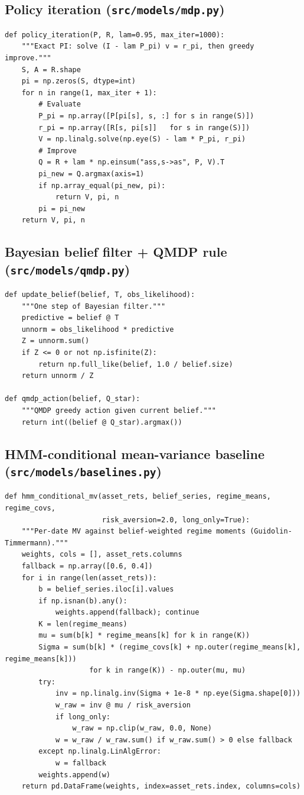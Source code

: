 \documentclass[11pt]{article}
\theoremstyle{plain1}
\theoremstyle{definition1}
\newcommand{\1}{\mathbf{1}}
\begin{document}
\subsection{Policy iteration (\texttt{src/models/mdp.py})}
\begin{lstlisting}
def policy_iteration(P, R, lam=0.95, max_iter=1000):
    """Exact PI: solve (I - lam P_pi) v = r_pi, then greedy improve."""
    S, A = R.shape
    pi = np.zeros(S, dtype=int)
    for n in range(1, max_iter + 1):
        # Evaluate
        P_pi = np.array([P[pi[s], s, :] for s in range(S)])
        r_pi = np.array([R[s, pi[s]]   for s in range(S)])
        V = np.linalg.solve(np.eye(S) - lam * P_pi, r_pi)
        # Improve
        Q = R + lam * np.einsum("ass,s->as", P, V).T
        pi_new = Q.argmax(axis=1)
        if np.array_equal(pi_new, pi):
            return V, pi, n
        pi = pi_new
    return V, pi, n
\end{lstlisting}

\subsection{Bayesian belief filter + QMDP rule (\texttt{src/models/qmdp.py})}
\begin{lstlisting}
def update_belief(belief, T, obs_likelihood):
    """One step of Bayesian filter."""
    predictive = belief @ T
    unnorm = obs_likelihood * predictive
    Z = unnorm.sum()
    if Z <= 0 or not np.isfinite(Z):
        return np.full_like(belief, 1.0 / belief.size)
    return unnorm / Z

def qmdp_action(belief, Q_star):
    """QMDP greedy action given current belief."""
    return int((belief @ Q_star).argmax())
\end{lstlisting}

\subsection{HMM-conditional mean-variance baseline (\texttt{src/models/baselines.py})}
\begin{lstlisting}
def hmm_conditional_mv(asset_rets, belief_series, regime_means, regime_covs,
                       risk_aversion=2.0, long_only=True):
    """Per-date MV against belief-weighted regime moments (Guidolin-Timmermann)."""
    weights, cols = [], asset_rets.columns
    fallback = np.array([0.6, 0.4])
    for i in range(len(asset_rets)):
        b = belief_series.iloc[i].values
        if np.isnan(b).any():
            weights.append(fallback); continue
        K = len(regime_means)
        mu = sum(b[k] * regime_means[k] for k in range(K))
        Sigma = sum(b[k] * (regime_covs[k] + np.outer(regime_means[k], regime_means[k]))
                    for k in range(K)) - np.outer(mu, mu)
        try:
            inv = np.linalg.inv(Sigma + 1e-8 * np.eye(Sigma.shape[0]))
            w_raw = inv @ mu / risk_aversion
            if long_only:
                w_raw = np.clip(w_raw, 0.0, None)
            w = w_raw / w_raw.sum() if w_raw.sum() > 0 else fallback
        except np.linalg.LinAlgError:
            w = fallback
        weights.append(w)
    return pd.DataFrame(weights, index=asset_rets.index, columns=cols)
\end{lstlisting}
\end{document}
